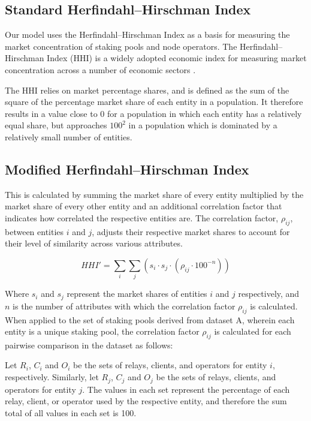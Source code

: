 \documentclass[conference]{IEEEtran}
\begin{document}
\subsection{Standard Herfindahl–Hirschman Index}
\label{sec:standard-hhi}

Our model uses the Herfindahl–Hirschman Index as a basis for measuring the market concentration of staking pools and node operators.  The Herfindahl–Hirschman Index (HHI) is a widely adopted economic index for measuring market concentration across a number of economic sectors \cite{OECD2021}.

The HHI relies on market percentage shares, and is defined as the sum of the square of the percentage market share of each entity in a population.  It therefore results in a value close to 0 for a population in which each entity has a relatively equal share, but approaches $100^2$ in a population which is dominated by a relatively small number of entities.

\subsection{Modified Herfindahl–Hirschman Index}
\label{sec:modified-hhi}
This is calculated by summing the market share of every entity multiplied by the market share of every other entity and an additional correlation factor that indicates how correlated the respective entities are.  The correlation factor, $\rho_{ij}$, between entities $i$ and $j$, adjusts their respective market shares to account for their level of similarity across various attributes.

\[
HHI' = \sum_i \sum_j \left( s_i \cdot s_j \cdot \left( \rho_{ij} \cdot 100^{-n} \right) \right)
\]

Where $s_i$ and $s_j$ represent the market shares of entities $i$ and $j$ respectively, and $n$ is the number of attributes with which the correlation factor $\rho_{ij}$ is calculated. When applied to the set of staking pools derived from dataset A, wherein each entity is a unique staking pool, the correlation factor $\rho_{ij}$ is calculated for each pairwise comparison in the dataset as follows:

Let $R_i$, $C_i$ and $O_i$ be the sets of relays, clients, and operators for entity $i$, respectively. Similarly, let $R_j$, $C_j$ and $O_j$ be the sets of relays, clients, and operators for entity $j$.  The values in each set represent the percentage of each relay, client, or operator used by the respective entity, and therefore the sum total of all values in each set is 100.
\end{document}
